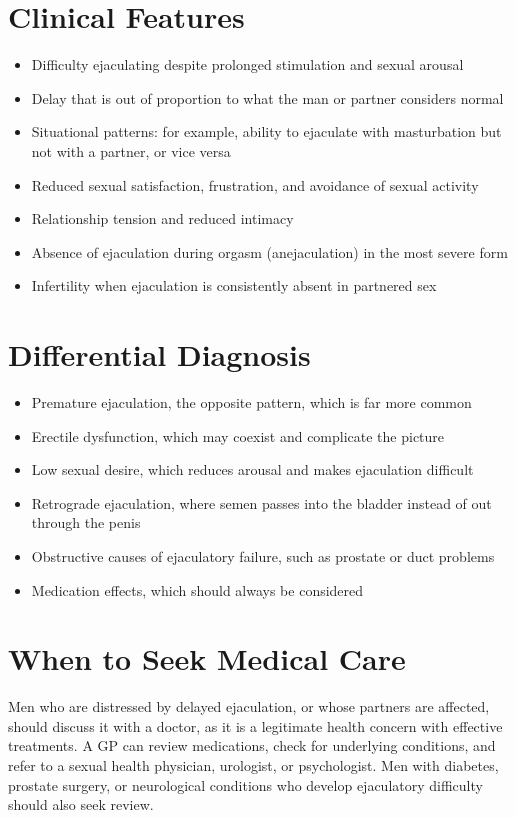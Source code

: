 \section*{Clinical Features}
\begin{itemize}
    \item Difficulty ejaculating despite prolonged stimulation and sexual arousal
    \item Delay that is out of proportion to what the man or partner considers normal
    \item Situational patterns: for example, ability to ejaculate with masturbation but not with a partner, or vice versa
    \item Reduced sexual satisfaction, frustration, and avoidance of sexual activity
    \item Relationship tension and reduced intimacy
    \item Absence of ejaculation during orgasm (anejaculation) in the most severe form
    \item Infertility when ejaculation is consistently absent in partnered sex
\end{itemize}

\section*{Differential Diagnosis}
\begin{itemize}
    \item Premature ejaculation, the opposite pattern, which is far more common
    \item Erectile dysfunction, which may coexist and complicate the picture
    \item Low sexual desire, which reduces arousal and makes ejaculation difficult
    \item Retrograde ejaculation, where semen passes into the bladder instead of out through the penis
    \item Obstructive causes of ejaculatory failure, such as prostate or duct problems
    \item Medication effects, which should always be considered
\end{itemize}

\section*{When to Seek Medical Care}
Men who are distressed by delayed ejaculation, or whose partners are affected, should discuss it with a doctor, as it is a legitimate health concern with effective treatments. A GP can review medications, check for underlying conditions, and refer to a sexual health physician, urologist, or psychologist. Men with diabetes, prostate surgery, or neurological conditions who develop ejaculatory difficulty should also seek review.

